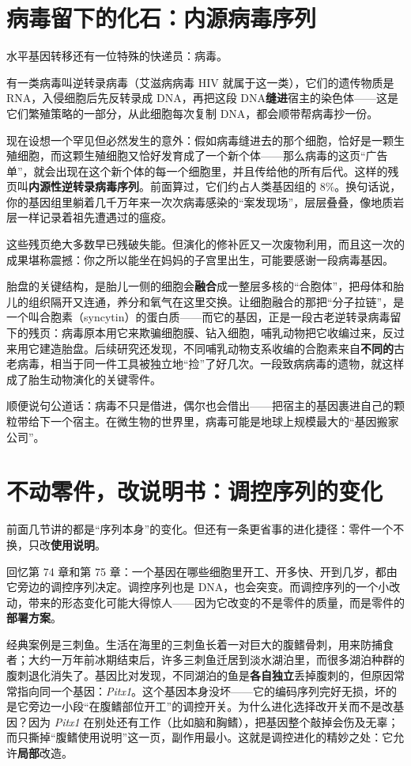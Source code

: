 \section{病毒留下的化石：内源病毒序列}

水平基因转移还有一位特殊的快递员：病毒。

有一类病毒叫逆转录病毒（艾滋病病毒 HIV 就属于这一类），它们的遗传物质是 RNA，入侵细胞后先反转录成 DNA，再把这段 DNA\textbf{缝进}宿主的染色体——这是它们繁殖策略的一部分，从此细胞每次复制 DNA，都会顺带帮病毒抄一份。

现在设想一个罕见但必然发生的意外：假如病毒缝进去的那个细胞，恰好是一颗生殖细胞，而这颗生殖细胞又恰好发育成了一个新个体——那么病毒的这页“广告单”，就会出现在这个新个体的每一个细胞里，并且传给他的所有后代。这样的残页叫\textbf{内源性逆转录病毒序列}。前面算过，它们约占人类基因组的 8\%。换句话说，你的基因组里躺着几千万年来一次次病毒感染的“案发现场”，层层叠叠，像地质岩层一样记录着祖先遭遇过的瘟疫。

这些残页绝大多数早已残破失能。但演化的修补匠又一次废物利用，而且这一次的成果堪称震撼：你之所以能坐在妈妈的子宫里出生，可能要感谢一段病毒基因。

胎盘的关键结构，是胎儿一侧的细胞会\textbf{融合}成一整层多核的“合胞体”，把母体和胎儿的组织隔开又连通，养分和氧气在这里交换。让细胞融合的那把“分子拉链”，是一个叫合胞素（syncytin）的蛋白质——而它的基因，正是一段古老逆转录病毒留下的残页：病毒原本用它来欺骗细胞膜、钻入细胞，哺乳动物把它收编过来，反过来用它建造胎盘。后续研究还发现，不同哺乳动物支系收编的合胞素来自\textbf{不同的}古老病毒，相当于同一件工具被独立地“捡”了好几次。一段致病病毒的遗物，就这样成了胎生动物演化的关键零件。

顺便说句公道话：病毒不只是借进，偶尔也会借出——把宿主的基因裹进自己的颗粒带给下一个宿主。在微生物的世界里，病毒可能是地球上规模最大的“基因搬家公司”。

\section{不动零件，改说明书：调控序列的变化}

前面几节讲的都是“序列本身”的变化。但还有一条更省事的进化捷径：零件一个不换，只改\textbf{使用说明}。

回忆第 74 章和第 75 章：一个基因在哪些细胞里开工、开多快、开到几岁，都由它旁边的调控序列决定。调控序列也是 DNA，也会突变。而调控序列的一个小改动，带来的形态变化可能大得惊人——因为它改变的不是零件的质量，而是零件的\textbf{部署方案}。

经典案例是三刺鱼。生活在海里的三刺鱼长着一对巨大的腹鳍骨刺，用来防捕食者；大约一万年前冰期结束后，许多三刺鱼迁居到淡水湖泊里，而很多湖泊种群的腹刺退化消失了。基因比对发现，不同湖泊的鱼是\textbf{各自独立}丢掉腹刺的，但原因常常指向同一个基因：\emph{Pitx1}。这个基因本身没坏——它的编码序列完好无损，坏的是它旁边一小段“在腹鳍部位开工”的调控开关。为什么进化选择改开关而不是改基因？因为 \emph{Pitx1} 在别处还有工作（比如脑和胸鳍），把基因整个敲掉会伤及无辜；而只撕掉“腹鳍使用说明”这一页，副作用最小。这就是调控进化的精妙之处：它允许\textbf{局部}改造。

